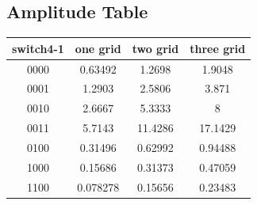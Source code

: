 \documentclass[11pt]{scrartcl}
\begin{document}
\subsection{Amplitude Table}
\label{sec:amp}
\begin{center}
\begin{tabular}{cccc}
switch4-1& one grid & two grid & three grid\\ \hline 
0000&0.63492&1.2698&1.9048\\ \hline




0001&1.2903&2.5806&3.871\\ \hline




0010&2.6667&5.3333&8\\ \hline




0011&5.7143&11.4286&17.1429\\ \hline




0100&0.31496&0.62992&0.94488\\ \hline




1000&0.15686&0.31373&0.47059\\ \hline




1100&0.078278&0.15656&0.23483\\ \hline
\end{tabular}
\end{center}
\end{document}
